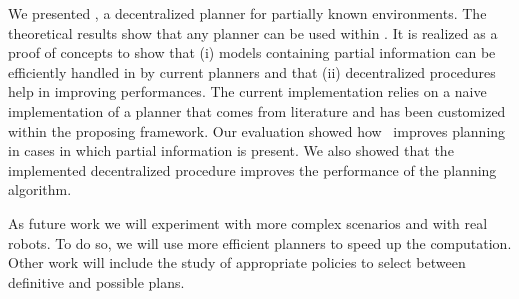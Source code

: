 We presented  \toolName, a  decentralized planner for partially known environments.
The theoretical results show that any planner can be used within \toolName. %
It is realized as a proof of concepts to show that (i) models containing partial information can be efficiently handled in by current planners and that (ii) decentralized procedures help in improving performances.
The current implementation relies on a naive implementation of a planner that comes from literature and has been customized within the proposing framework.
Our evaluation showed how  \toolName\ improves planning in cases in which partial information is present.
We also showed that the implemented decentralized procedure improves the performance of the planning algorithm.

As future work we will experiment with more complex scenarios and with real robots.
To do so, we will use more efficient planners to speed up the computation.
Other work will include the study of appropriate policies to select between definitive and possible plans.
